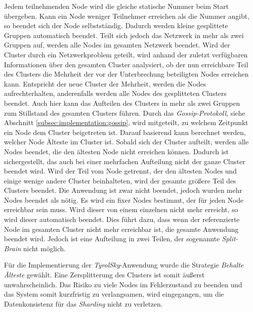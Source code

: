 \begin{itemize}
  Jedem teilnehmenden Node wird die gleiche statische Nummer beim Start übergeben. Kann ein Node weniger Teilnehmer erreichen als die Nummer angibt, so beendet sich der Node selbstständig. Dadurch werden kleine gesplittete Gruppen automatisch beendet. Teilt sich jedoch das Netzwerk in mehr als zwei Gruppen auf, werden alle Nodes im gesamten Netzwerk beendet. 
  Wird der Cluster durch ein Netzwerkproblem geteilt, wird anhand der zuletzt verfügbaren Informationen über den gesamten Cluster analysiert, ob der nun erreichbare Teil des Clusters die Mehrheit der vor der Unterbrechung beteiligten Nodes erreichen kann. Entspricht der neue Cluster der Mehrheit, werden die Nodes aufrechterhalten, anderenfalls werden alle Nodes des gesplitteten Clusters beendet. Auch hier kann das Aufteilen des Clusters in mehr als zwei Gruppen zum Stillstand des gesamten Clusters führen.
  Durch das \textit{Gossip-Protokoll}, siehe Abschnitt \ref{subsec:implementation:gossip}, wird mitgeteilt, zu welchem Zeitpunkt ein Node dem Cluster beigetreten ist. Darauf basierend kann berechnet werden, welcher Node Älteste im Cluster ist. Sobald sich der Cluster aufteilt, werden alle Nodes beendet, die den ältesten Node nicht erreichen können. Dadurch ist sichergestellt, das auch bei einer mehrfachen Aufteilung nicht der ganze Cluster beendet wird. Wird der Teil vom Node getrennt, der den ältesten Nodes und einige wenige andere Cluster beinhalteten, wird der gesamte größere Teil des Clusters beendet. Die Anwendung ist zwar nicht beendet, jedoch wurden mehr Nodes beendet als nötig. 
  Es wird ein fixer Nodes bestimmt, der für jeden Node erreichbar sein muss. Wird dieser von einem einzelnen nicht mehr erreicht, so wird dieser automatisch beendet. Dies führt dazu, dass wenn der referenzierte Node im gesamten Cluster nicht mehr erreichbar ist, die gesamte Anwendung beendet wird. Jedoch ist eine Aufteilung in zwei Teilen, der sogenannte \textit{Split-Brain} nicht möglich.
\end{itemize}
Für die Implementierung der \textit{TyrolSky}-Anwendung wurde die Strategie \textit{Behalte Älteste} gewählt. Eine Zersplitterung des Clusters ist somit äußerst unwahrscheinlich. Das Risiko zu viele Nodes im Fehlerzustand zu beenden und das System somit kurzfristig zu verlangsamen, wird eingegangen, um die Datenkonsistenz für das \textit{Sharding} nicht zu verletzen.  

